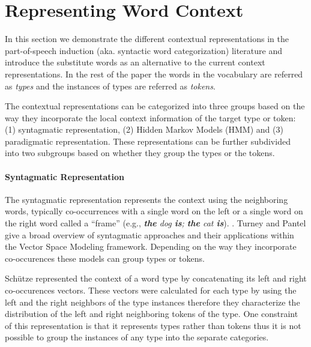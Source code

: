 \section{Representing Word Context}
\label{sec:representation}


In this section we demonstrate the different contextual
representations in the part-of-speech induction (aka. syntactic word
categorization) literature and introduce the substitute words as an
alternative to the current context representations.  In the rest of
the paper the words in the vocabulary are referred as {\em types} and
the instances of types are referred as {\em tokens}.

The contextual representations can be categorized into three groups
based on the way they incorporate the local context information of the
target type or token: (1) syntagmatic representation, (2) Hidden
Markov Models (HMM) and (3) paradigmatic representation.  These
representations can be further subdivided into two subgroups based on
whether they group the types or the tokens.

\paragraph{Syntagmatic Representation}

The syntagmatic representation represents the context using the
neighboring words, typically co-occurrences with a single word on the
left or a single word on the right word called a ``frame'' (e.g., {\em
  {\bf the} dog {\bf is}; {\bf the} cat {\bf is}}).
\cite{SchutzePe93,redington1998distributional,mintz2003frequent,20674613,lamar-EtAl:2010:Short,maron2010sphere}.
Turney and Pantel  give a
broad overview of syntagmatic approaches and their applications within
the Vector Space Modeling framework.  Depending on the way they
incorporate co-occurences these models can group types or tokens.

Sch\"{u}tze  represented the context of a word
type by concatenating its left and right co-occurences vectors.  These
vectors were calculated for each type by using the left and the right
neighbors of the type instances therefore they characterize the
distribution of the left and right neighboring tokens of the type.
One constraint of this representation is that it represents types
rather than tokens thus it is not possible to group the instances of
any type into the separate categories.

